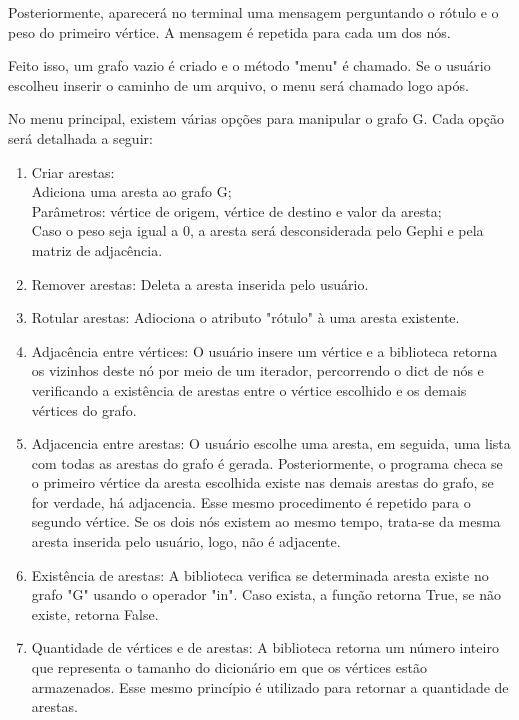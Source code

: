 \documentclass[12pt]{article}
\begin{document}
Posteriormente, aparecerá no terminal uma mensagem perguntando o rótulo e o peso do primeiro vértice. A mensagem é repetida para cada um dos nós.

Feito isso, um grafo vazio é criado e o método "menu" é chamado. Se o usuário escolheu inserir o caminho de um arquivo, o menu será chamado logo após.

No menu principal, existem várias opções para manipular o grafo G. Cada opção será detalhada a seguir:

\begin{enumerate}[itemsep=8pt,parsep=8pt]
    \item Criar arestas:\\ Adiciona uma aresta ao grafo G;\\ Parâmetros: vértice de origem, vértice de destino e valor da aresta;\\ Caso o peso seja igual a 0, a aresta será desconsiderada pelo Gephi e pela matriz de adjacência.
    
    \item Remover arestas: Deleta a aresta inserida pelo usuário.
    
    \item Rotular arestas: Adiociona o atributo "rótulo" à uma aresta existente.
    
    \item Adjacência entre vértices: O usuário insere um vértice e a biblioteca retorna os vizinhos deste nó por meio de um iterador, percorrendo o dict de nós e verificando a existência de arestas entre o vértice escolhido e os demais vértices do grafo.
    
    \item Adjacencia entre arestas: O usuário escolhe uma aresta, em seguida, uma lista com todas as arestas do grafo é gerada. Posteriormente, o programa checa se o primeiro vértice da aresta escolhida existe nas demais arestas do grafo, se for verdade, há adjacencia. Esse mesmo procedimento é repetido para o segundo vértice. Se os dois nós existem ao mesmo tempo, trata-se da mesma aresta inserida pelo usuário, logo, não é adjacente.
    
    \item Existência de arestas: A biblioteca verifica se determinada aresta existe no grafo "G" usando o operador "in". Caso exista, a função retorna True, se não existe, retorna False.
    
    \item Quantidade de vértices e de arestas: A biblioteca retorna um número inteiro que representa o tamanho do dicionário em que os vértices estão armazenados. Esse mesmo princípio é utilizado para retornar a quantidade de arestas.
    

\end{enumerate}
\end{document}
